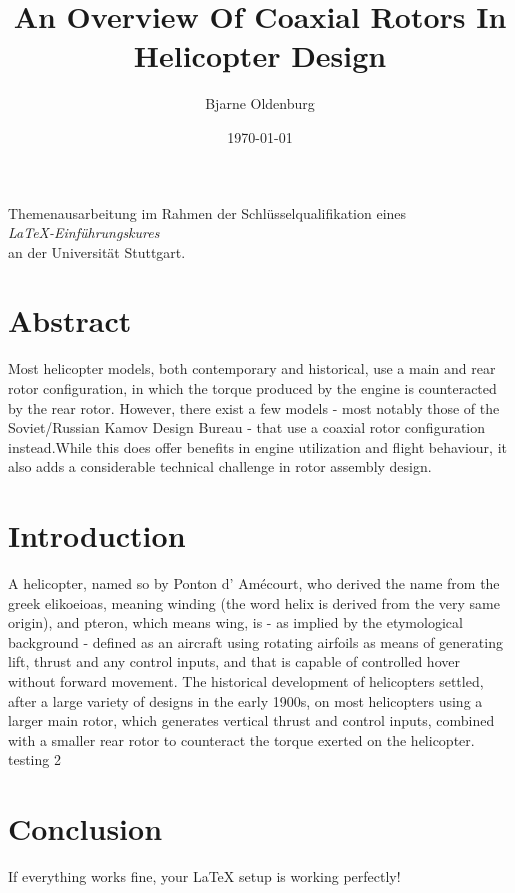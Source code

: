 \documentclass[11pt, a4paper]{scrartcl}
\title{An Overview Of Coaxial Rotors In Helicopter Design}
\author{Bjarne Oldenburg}
\date{\today}
\begin{document}
\maketitle

\begin{center}
    Themenausarbeitung im Rahmen der Schlüsselqualifikation eines\\ \emph{\LaTeX-Einführungskures}\\ an der Universität Stuttgart.
    \vspace{1cm}\\
\end{center}

\section{Abstract}
Most helicopter models, both contemporary and historical, use a main and rear rotor configuration, in which the torque produced by the engine is counteracted
by the rear rotor. However, there exist a few models - most notably those of the Soviet/Russian Kamov Design Bureau - that use a coaxial rotor configuration instead.While this does offer benefits in engine utilization and flight behaviour, it also adds a considerable technical challenge in rotor assembly design.

\section{Introduction}
A helicopter, named so by Ponton d' Amécourt, who derived the name from the greek elikoeioas, meaning winding (the word helix is derived from the very same origin), and pteron, which means wing, is - as implied by the etymological background - defined as an aircraft using rotating airfoils as means of generating lift, thrust and any control inputs, and that is capable of controlled hover without forward movement. The historical development of helicopters settled, after a large variety of designs in the early 1900s, on most helicopters using a larger main rotor, which generates vertical thrust and control inputs, combined with a smaller rear rotor to counteract the torque exerted on the helicopter. testing 2

\section{Conclusion}
If everything works fine, your LaTeX setup is working perfectly!
\end{document}
